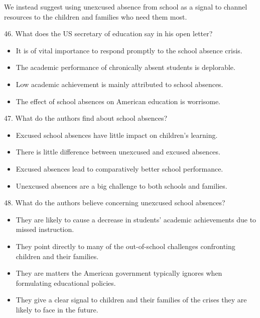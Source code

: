 \documentclass[UTF8,11pt]{ctexart}
\begin{document}
We instead suggest using unexcused absence from school as a signal to channel resources to the children and families who need them most.


46. What does the US secretary of education say in his open letter?


\begin{itemize}[leftmargin=2em,itemsep=.2em,topsep=.4em]\item[A.] It is of vital importance to respond promptly to the school absence crisis.
\item[B.] The academic performance of chronically absent students is deplorable.
\item[C.] Low academic achievement is mainly attributed to school absences.
\item[D.] The effect of school absences on American education is worrisome.
\end{itemize}

47. What do the authors find about school absences?


\begin{itemize}[leftmargin=2em,itemsep=.2em,topsep=.4em]\item[A.] Excused school absences have little impact on children’s learning.
\item[B.] There is little difference between unexcused and excused absences.
\item[C.] Excused absences lead to comparatively better school performance.
\item[D.] Unexcused absences are a big challenge to both schools and families.
\end{itemize}

48. What do the authors believe concerning unexcused school absences?


\begin{itemize}[leftmargin=2em,itemsep=.2em,topsep=.4em]\item[A.] They are likely to cause a decrease in students’ academic achievements due to missed instruction.
\item[B.] They point directly to many of the out-of-school challenges confronting children and their families.
\item[C.] They are matters the American government typically ignores when formulating educational policies.
\item[D.] They give a clear signal to children and their families of the crises they are likely to face in the future.
\end{itemize}
\end{document}
